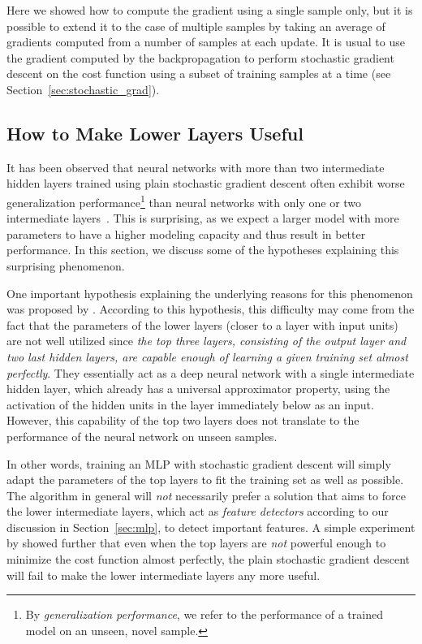 \documentclass{now}
\begin{document}
Here we showed how to compute the gradient using a single sample only, but it is
possible to extend it to the case of multiple samples by taking an average of
gradients computed from a number of samples at each update. It is usual to use
the gradient computed by the backpropagation to perform stochastic gradient
descent on the cost function using a subset of training samples at a time (see
Section~\ref{sec:stochastic_grad}). 

\subsection{How to Make Lower Layers Useful}
\label{sec:bp_imp}

It has been observed that neural networks with more than two intermediate hidden
layers trained using plain stochastic gradient descent often exhibit worse
generalization performance\footnote{
    By \textit{generalization performance}, we refer to the performance of a
    trained model on an unseen, novel sample.
}
than neural networks with only one or two intermediate layers~\citep[see,
e.g.][]{Bengio2007a}. This is surprising, as we expect a larger model with more
parameters to have a higher modeling capacity and thus result in better
performance. In this section, we discuss some of the hypotheses explaining this
surprising phenomenon.

One important hypothesis explaining the underlying reasons for this phenomenon
was proposed by \citet{Bengio2007nips}.  According to this hypothesis, this
difficulty may come from the fact that the parameters of the lower layers
(closer to a layer with input units) are not well utilized since \textit{the top
three layers, consisting of the output layer and two last hidden layers, are
capable enough of learning a given training set almost perfectly}.  They
essentially act as a deep neural network with a single intermediate hidden
layer, which already has a universal approximator property, using the activation
of the hidden units in the layer immediately below as an input. However, this
capability of the top two layers does not translate to the performance of the
neural network on unseen samples.

In other words, training an MLP with stochastic gradient descent will simply
adapt the parameters of the top layers to fit the training set as well as
possible. The algorithm in general will \textit{not} necessarily prefer a
solution that aims to force the lower intermediate layers, which act as
\textit{feature detectors} according to our discussion in Section~\ref{sec:mlp},
to detect important features.  A simple experiment by \citet{Bengio2007nips}
showed further that even when the top layers are \textit{not} powerful enough to
minimize the cost function almost perfectly, the plain stochastic gradient
descent will fail to make the lower intermediate layers any more useful.
\end{document}
